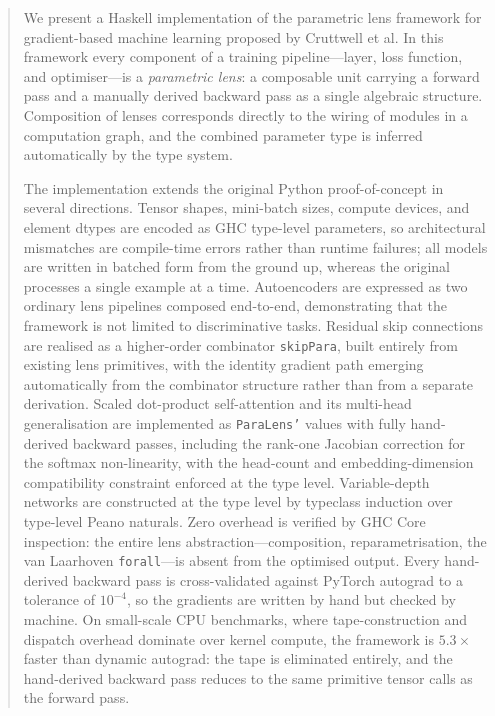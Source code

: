 \begin{abstract}
\noindent
We present a Haskell implementation of the parametric lens framework for
gradient-based machine learning proposed by Cruttwell et al.
In this framework every component of a training pipeline---layer, loss
function, and optimiser---is a \emph{parametric lens}: a composable unit
carrying a forward pass and a manually derived backward pass as a single
algebraic structure.  Composition of lenses corresponds directly to the
wiring of modules in a computation graph, and the combined parameter type
is inferred automatically by the type system.

The implementation extends the original Python proof-of-concept in several
directions.  Tensor shapes, mini-batch sizes, compute devices, and element
dtypes are encoded as GHC type-level parameters, so architectural
mismatches are compile-time errors rather than runtime failures; all models
are written in batched form from the ground up, whereas the original
processes a single example at a time.  Autoencoders are expressed as two
ordinary lens pipelines composed end-to-end, demonstrating that the
framework is not limited to discriminative tasks.  Residual skip
connections are realised as a higher-order combinator \texttt{skipPara},
built entirely from existing lens primitives, with the identity gradient
path emerging automatically from the combinator structure rather than from
a separate derivation.  Scaled dot-product self-attention and its
multi-head generalisation are implemented as \texttt{ParaLens'} values with
fully hand-derived backward passes, including the rank-one Jacobian
correction for the softmax non-linearity, with the head-count and
embedding-dimension compatibility constraint enforced at the type level.
Variable-depth networks are constructed at the type level by typeclass induction
over type-level Peano naturals.  Zero overhead is verified by GHC Core
inspection: the entire lens abstraction---composition,
reparametrisation, the van Laarhoven \texttt{forall}---is absent from the
optimised output.  Every hand-derived backward pass is cross-validated
against PyTorch autograd to a tolerance of $10^{-4}$, so the gradients are
written by hand but checked by machine.  On small-scale CPU benchmarks,
where tape-construction and dispatch overhead dominate over kernel
compute, the framework is $5.3\times$ faster than dynamic autograd: the
tape is eliminated entirely, and the hand-derived backward pass reduces to
the same primitive tensor calls as the forward pass.
\end{abstract}
